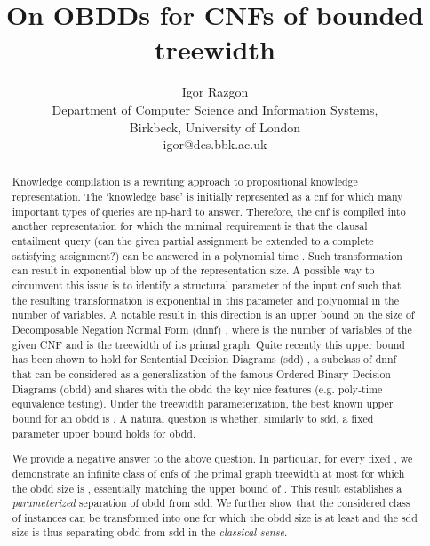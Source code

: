 \documentclass{article}
\date{}
\title{On OBDDs for CNFs of bounded treewidth}
\author{Igor Razgon\\ Department of Computer Science and Information Systems,\\ Birkbeck, University of London\\
        igor@dcs.bbk.ac.uk}
\begin{document}
\maketitle
\begin{abstract}
Knowledge compilation is a rewriting approach to propositional knowledge representation.
The `knowledge base' is initially represented as a {\sc cnf} for which many important types of
queries are {\sc np}-hard to answer. Therefore, the {\sc cnf} is compiled into another
representation for which the minimal requirement is that the clausal entailment query
(can the given partial assignment be extended to a complete satisfying assignment?)
can be answered in a polynomial time \cite{DerMar}. Such transformation can result in exponential
blow up of the representation size. A possible way to circumvent this issue is to
identify a structural parameter of the input {\sc cnf} such that the resulting transformation
is exponential in this parameter and polynomial in the number of variables.
A notable result in this direction is an  upper bound on the size of
Decomposable Negation Normal Form ({\sc dnnf}) \cite{DarwicheJACM}, where  is the
number of variables of the given CNF and  is the treewidth of its primal graph. Quite recently
this upper bound has been shown to hold for Sentential Decision Diagrams ({\sc sdd}) \cite{SDD}, 
a subclass of {\sc dnnf} that can be considered as a generalization of the famous Ordered Binary Decision Diagrams
({\sc obdd}) and shares with the {\sc obdd} the key nice features (e.g. poly-time equivalence testing). Under the 
treewidth parameterization, the best known upper bound for an {\sc obdd} is  \cite{VardiTWD}. 
A natural question is whether, similarly to {\sc sdd}, a fixed parameter upper bound holds for {\sc obdd}.

We provide a negative answer to the above question. In particular, for every fixed , 
we demonstrate an infinite class of {\sc cnf}s of the primal graph treewidth at most  for which the 
{\sc obdd} size is , essentially matching the upper bound of \cite{VardiTWD}.
This result establishes a \emph{parameterized} separation of {\sc obdd} from {\sc sdd}. We further show that
the considered class of instances can be transformed into one for which the {\sc obdd} size is at least 
and the {\sc sdd} size is  thus separating {\sc obdd} from {\sc sdd} in the \emph{classical sense}. 



\end{abstract}
\end{document}
